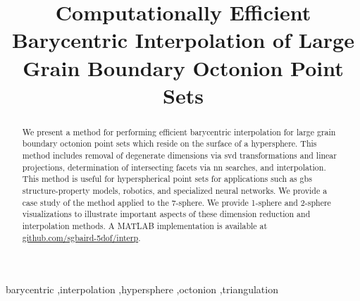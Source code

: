 \documentclass[final,12pt]{elsarticle}
\begin{document}
	
	\sloppy %
	
	\begin{frontmatter}
		
		\title{Computationally Efficient Barycentric Interpolation of Large Grain Boundary Octonion Point Sets}
		
		
		
		\begin{abstract}
			We present a method for performing efficient barycentric interpolation for large grain boundary octonion point sets which reside on the surface of a hypersphere. This method includes removal of degenerate dimensions via \gls{svd} transformations and linear projections, determination of intersecting facets via \gls{nn} searches, and interpolation. This method is useful for hyperspherical point sets for applications such as \glspl{gb} structure-property models, robotics, and specialized neural networks. We provide a case study of the method applied to the 7-sphere. We provide 1-sphere and 2-sphere visualizations to illustrate important aspects of these dimension reduction and interpolation methods. A MATLAB implementation is available at \url{github.com/sgbaird-5dof/interp}.
		\end{abstract}
	
	\begin{keyword}
		barycentric \sep interpolation \sep hypersphere \sep octonion \sep triangulation %
	\end{keyword}

	\end{frontmatter}
\end{document}
